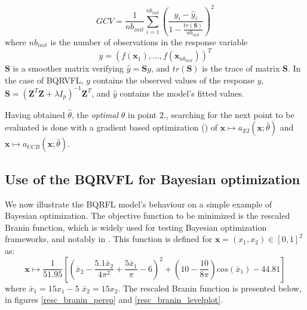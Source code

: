 \begin{equation}
GCV = \frac{1}{nb_{init}}\sum_{i = 1}^{nb_{init}} \left( \frac{y_i - \hat{y}_i}{1 - \frac{tr(\textbf{S})}{nb_{init}}} \right)^2 
\end{equation}
where $nb_{init}$ is the number of observations in the response variable 
$$
y = \left( f(\textbf{x}_1), \ldots, f(\textbf{x}_{nb_{init}}) \right)^T
$$
$\textbf{S}$ is a smoother matrix verifying $\hat{y} = \textbf{S}y$, and $tr(\textbf{S})$ is the trace of matrix $\textbf{S}$. In the case of BQRVFL, $y$ contains the observed values of the response $y$, $\textbf{S} = \left(\textbf{Z}^T\textbf{Z} + \lambda I_p \right)^{-1}\textbf{Z}^T$, and $\hat{y}$ contains the model's fitted values. 

Having obtained $\hat{\theta}$, the \textit{optimal} $\theta$ in point $2.$, searching for the next point to be evaluated is done with a gradient based optimization (\cite{gay1990usage}) of $\textbf{x} \mapsto a_{EI}\left(\textbf{x}; \hat{\theta} \right)$ and $\textbf{x} \mapsto a_{UCB}\left(\textbf{x}; \hat{\theta}  \right)$. 

\subsection{Use of the BQRVFL for Bayesian optimization}

We now illustrate the BQRFL model's behaviour on a simple example of Bayesian optimization. The objective function to be minimized is the rescaled Branin function, which is widely used for testing Bayesian optimization frameworks, and notably in \cite{picheny2013benchmark}. 
This function is defined for $\textbf{x} = (x_1, x_2) \in [0, 1]^2$ as: 
\begin{equation}
\textbf{x} \mapsto \frac{1}{51.95}\left[\left(\bar{x}_2 - \frac{5.1\bar{x}_2}{4 \pi^2} + \frac{5\bar{x}_1}{\pi}-6\right)^2  + \left(10 - \frac{10}{8\pi}\right)cos(\bar{x}_1) - 44.81 \right]
\end{equation}
where $\bar{x}_1 = 15 x_1 - 5$ $\bar{x}_2 = 15 x_2$. The rescaled Branin function is presented below, in figures \ref{resc_branin_persp} and \ref{resc_branin_levelplot}. 


